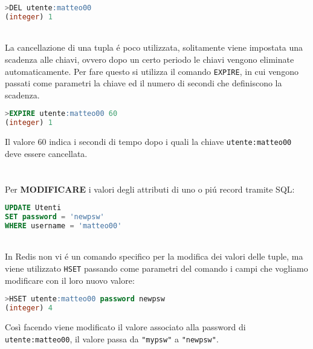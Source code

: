 \begin{lstlisting}[autogobble, style=redis-cli, language=SQL]
>DEL utente:matteo00
(integer) 1\end{lstlisting}
\\
La cancellazione di una tupla é poco utilizzata, solitamente viene impostata una scadenza alle chiavi, ovvero dopo un certo periodo le chiavi vengono eliminate automaticamente.
Per fare questo si utilizza il comando \texttt{EXPIRE}, in cui vengono passati come parametri la chiave ed il numero di secondi che definiscono la scadenza.
\begin{lstlisting}[autogobble, style=redis-cli, language=SQL]
>EXPIRE utente:matteo00 60
(integer) 1\end{lstlisting}
Il valore 60 indica i secondi di tempo dopo i quali la chiave \texttt{utente:matteo00} deve essere cancellata.\\
 \\
\\
Per \textbf{MODIFICARE} i valori degli attributi di uno o piú record tramite SQL:
\begin{lstlisting}[autogobble, style=redis-cli, language=SQL]
UPDATE Utenti
SET password = 'newpsw'
WHERE username = 'matteo00'\end{lstlisting}
\\
In Redis non vi é un comando specifico per la modifica dei valori delle tuple, ma viene utilizzato \texttt{HSET} passando come parametri del comando
i campi che vogliamo modificare con il loro nuovo valore:
\begin{lstlisting}[autogobble, style=redis-cli, language=SQL]
>HSET utente:matteo00 password newpsw
(integer) 4\end{lstlisting}
Così facendo viene modificato il valore associato alla password di \texttt{utente:matteo00}, il valore passa da \texttt{"mypsw"} a \texttt{"newpsw"}.

